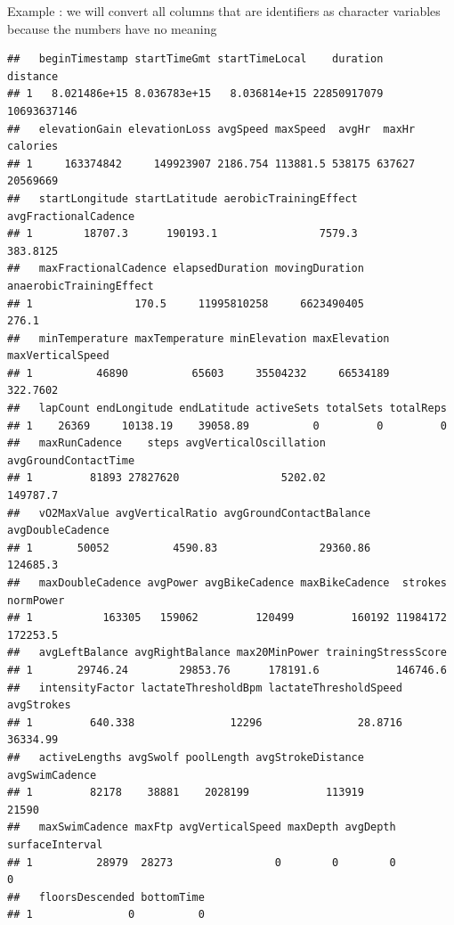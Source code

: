 \documentclass[
]{book}
\newenvironment{Shaded}{\begin{snugshade}}{\end{snugshade}}
\newcommand{\CommentTok}[1]{\textcolor[rgb]{0.56,0.35,0.01}{\textit{#1}}}
\newcommand{\ControlFlowTok}[1]{\textcolor[rgb]{0.13,0.29,0.53}{\textbf{#1}}}
\newcommand{\DataTypeTok}[1]{\textcolor[rgb]{0.13,0.29,0.53}{#1}}
\newcommand{\KeywordTok}[1]{\textcolor[rgb]{0.13,0.29,0.53}{\textbf{#1}}}
\newcommand{\NormalTok}[1]{#1}
\newcommand{\OperatorTok}[1]{\textcolor[rgb]{0.81,0.36,0.00}{\textbf{#1}}}
\newcommand{\StringTok}[1]{\textcolor[rgb]{0.31,0.60,0.02}{#1}}
\begin{document}
Example : we will convert all columns that are identifiers as character variables because the numbers have no meaning

\begin{Shaded}
\end{Shaded}

\begin{verbatim}
##   beginTimestamp startTimeGmt startTimeLocal    duration    distance
## 1   8.021486e+15 8.036783e+15   8.036814e+15 22850917079 10693637146
##   elevationGain elevationLoss avgSpeed maxSpeed  avgHr  maxHr calories
## 1     163374842     149923907 2186.754 113881.5 538175 637627 20569669
##   startLongitude startLatitude aerobicTrainingEffect avgFractionalCadence
## 1        18707.3      190193.1                7579.3             383.8125
##   maxFractionalCadence elapsedDuration movingDuration anaerobicTrainingEffect
## 1                170.5     11995810258     6623490405                   276.1
##   minTemperature maxTemperature minElevation maxElevation maxVerticalSpeed
## 1          46890          65603     35504232     66534189         322.7602
##   lapCount endLongitude endLatitude activeSets totalSets totalReps
## 1    26369     10138.19    39058.89          0         0         0
##   maxRunCadence    steps avgVerticalOscillation avgGroundContactTime
## 1         81893 27827620                5202.02             149787.7
##   vO2MaxValue avgVerticalRatio avgGroundContactBalance avgDoubleCadence
## 1       50052          4590.83                29360.86         124685.3
##   maxDoubleCadence avgPower avgBikeCadence maxBikeCadence  strokes normPower
## 1           163305   159062         120499         160192 11984172  172253.5
##   avgLeftBalance avgRightBalance max20MinPower trainingStressScore
## 1       29746.24        29853.76      178191.6            146746.6
##   intensityFactor lactateThresholdBpm lactateThresholdSpeed avgStrokes
## 1         640.338               12296               28.8716   36334.99
##   activeLengths avgSwolf poolLength avgStrokeDistance avgSwimCadence
## 1         82178    38881    2028199            113919          21590
##   maxSwimCadence maxFtp avgVerticalSpeed maxDepth avgDepth surfaceInterval
## 1          28979  28273                0        0        0               0
##   floorsDescended bottomTime
## 1               0          0
\end{verbatim}
\end{document}
